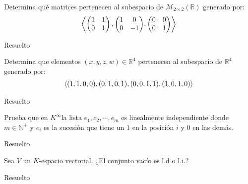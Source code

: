 \begin{exercise}{}{}
    Determina qué matrices pertenecen al subespacio de $\mathcal{M}_{2 \times 2}(\mathbb{R})$ generado por:
    \begin{align*}
        \biggl \langle{\begin{pmatrix}
            1 & 1 \\
            0 & 1
        \end{pmatrix}, \begin{pmatrix}
            1 & 0 \\
            0 & -1
        \end{pmatrix}},{\begin{pmatrix}
            0 & 0 \\
            0 & 1
        \end{pmatrix}} \biggr \rangle
    \end{align*}

\begin{solution}{}{}
Resuelto
\end{solution}
\end{exercise}



\begin{exercise}{}{}
    Determina que elementos $(x,y,z,w) \in \mathbb{R}^4$ pertenecen al subespacio de $\mathbb{R}^4$ generado por:
    \begin{align*}
        \mathinner{\langle{(1,1,0,0), (0,1,0,1), (0,0,1,1)},{(1,0,1,0)}\rangle}
    \end{align*}

\begin{solution}{}{}
Resuelto
\end{solution}
\end{exercise}


\begin{exercise}{}{}
    Prueba que en $K^{\infty}$la lista $e_1, e_2, \cdots, e_m$ es linealmente independiente donde $m \in \mathbb{N}^+$ y $e_i$ es la sucesión que tiene un $1$ en la posición $i$ y $0$ en las demás.

\begin{solution}{}{}
Resuelto
\end{solution}
\end{exercise}

\begin{exercise}{}{}
    Sea $V$ un $K$-espacio vectorial. ¿El conjunto vacío es l.d o l.i.?
\begin{solution}{}{}
Resuelto
\end{solution}
\end{exercise}

